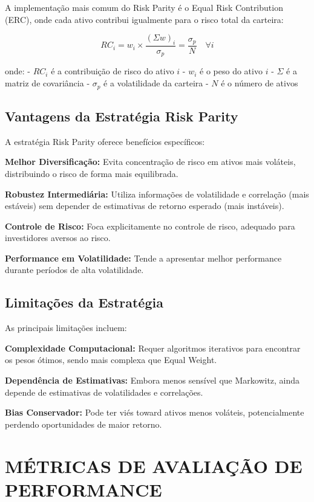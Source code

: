 A implementação mais comum do Risk Parity é o Equal Risk Contribution (ERC), onde cada ativo contribui igualmente para o risco total da carteira:

\begin{equation}
RC_i = w_i \times \frac{(\Sigma w)_i}{\sigma_p} = \frac{\sigma_p}{N} \quad \forall i
\end{equation}

onde:
- $RC_i$ é a contribuição de risco do ativo $i$
- $w_i$ é o peso do ativo $i$
- $\Sigma$ é a matriz de covariância
- $\sigma_p$ é a volatilidade da carteira
- $N$ é o número de ativos

\subsection{Vantagens da Estratégia Risk Parity}

A estratégia Risk Parity oferece benefícios específicos:

\textbf{Melhor Diversificação:} Evita concentração de risco em ativos mais voláteis, distribuindo o risco de forma mais equilibrada.

\textbf{Robustez Intermediária:} Utiliza informações de volatilidade e correlação (mais estáveis) sem depender de estimativas de retorno esperado (mais instáveis).

\textbf{Controle de Risco:} Foca explicitamente no controle de risco, adequado para investidores aversos ao risco.

\textbf{Performance em Volatilidade:} Tende a apresentar melhor performance durante períodos de alta volatilidade.

\subsection{Limitações da Estratégia}

As principais limitações incluem:

\textbf{Complexidade Computacional:} Requer algoritmos iterativos para encontrar os pesos ótimos, sendo mais complexa que Equal Weight.

\textbf{Dependência de Estimativas:} Embora menos sensível que Markowitz, ainda depende de estimativas de volatilidades e correlações.

\textbf{Bias Conservador:} Pode ter viés toward ativos menos voláteis, potencialmente perdendo oportunidades de maior retorno.

\section{MÉTRICAS DE AVALIAÇÃO DE PERFORMANCE}

